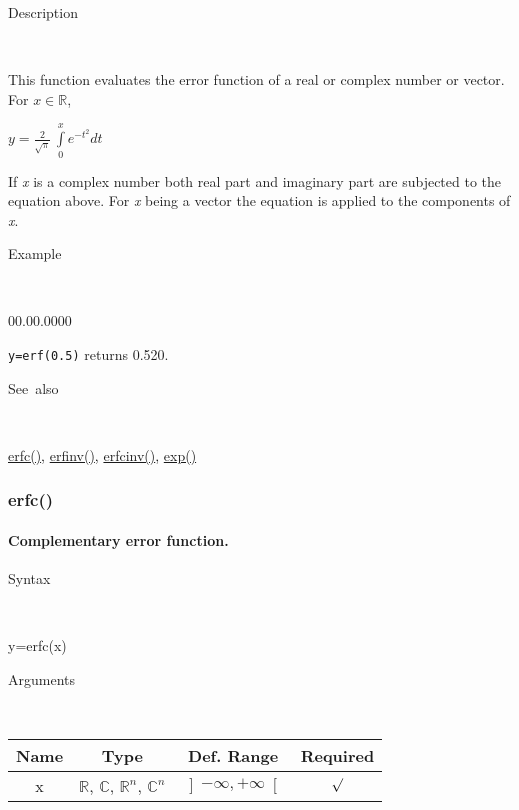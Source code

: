 \begin{description}
\item [Description]~
\end{description}
This function evaluates the error function of a real or complex number
or vector. For $x\in\mathbb{R}$,

\medskip{}
$y={\displaystyle \frac{2}{\sqrt{\pi}}\,\int\limits _{0}^{x}e^{-t^{2}}dt}$
\medskip{}

\noindent If \textit{x} is a complex number both real part and imaginary
part are subjected to the equation above. For \textit{x} being a vector
the equation is applied to the components of \textit{x}.

\begin{description}
\item [Example]~
\end{description}
\begin{lyxlist}{00.00.0000}
\item [\texttt{y=erf(0.5)}]returns 0.520.
\end{lyxlist}
\begin{description}
\item [See~also]~
\end{description}
\textcolor{blue}{\hyperlink{erfc}{erfc()}}\textcolor{black}{,} \textcolor{blue}{\hyperlink{erfinv}{erfinv()}}\textcolor{black}{,}
\textcolor{blue}{\hyperlink{erfcinv}{erfcinv()}}\textcolor{black}{,}
\textcolor{blue}{\hyperlink{exp}{exp()}}


\newpage
\subsubsection*{\hypertarget{erfc}{}{\Large erfc()}}


\paragraph{\label{par:Complementary-error-function}Complementary error function.}

\begin{description}
\item [Syntax]~
\end{description}
y=erfc(x)

\begin{description}
\item [Arguments]~
\end{description}
\begin{tabular}{|c|c|c|c|}
\hline 
Name&
Type&
Def. Range&
Required\tabularnewline
\hline
\hline 
x&
$\mathbb{R}$, $\mathbb{C}$, $\mathbb{R}^{n}$, $\mathbb{C}^{n}$&
$\left]-\infty,+\infty\right[$&
$\surd$\tabularnewline
\hline
\end{tabular}

